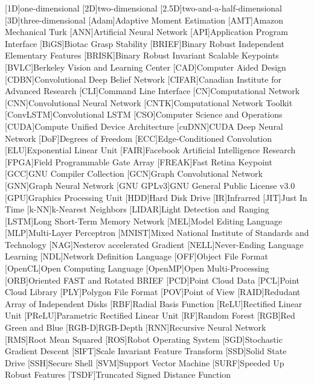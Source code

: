 \begin{acronym}
	[1D]{one-dimensional}
	[2D]{two-dimensional}
	[2.5D]{two-and-a-half-dimensional}
	[3D]{three-dimensional}
	[Adam]{Adaptive Moment Estimation}
	[AMT]{Amazon Mechanical Turk}
	[ANN]{Artificial Neural Network}
    [API]{Application Program Interface}
    [BiGS]{Biotac Grasp Stability}
	[BRIEF]{Binary Robust Independent Elementary Features}
	[BRISK]{Binary Robust Invariant Scalable Keypoints}
	[BVLC]{Berkeley Vision and Learning Center}
	[CAD]{Computer Aided Design}
	[CDBN]{Convolutional Deep Belief Network}
	[CIFAR]{Canadian Institute for Advanced Research}
	[CLI]{Command Line Interface}
	[CN]{Computational Network}
	[CNN]{Convolutional Neural Network}
    [CNTK]{Computational Network Toolkit}
    [ConvLSTM]{Convolutional LSTM}
	[CSO]{Computer Science and Operations}
	[CUDA]{Compute Unified Device Architecture}
    [cuDNN]{CUDA Deep Neural Network}
    [DoF]{Degrees of Freedom}
    [ECC]{Edge-Conditioned Convolution}
    [ELU]{Exponential Linear Unit}
	[FAIR]{Facebook Artificial Intelligence Research}
	[FPGA]{Field Programmable Gate Array}
	[FREAK]{Fast Retina Keypoint}
    [GCC]{GNU Compiler Collection}
    [GCN]{Graph Convolutional Network}
    [GNN]{Graph Neural Network}
	[GNU GPLv3]{GNU General Public License v3.0}
	[GPU]{Graphics Processing Unit}
	[HDD]{Hard Disk Drive}
	[IR]{Infrarred}
    [JIT]{Just In Time}
    [k-NN]{k-Nearest Neighbors}
    [LIDAR]{Light Detection and Ranging}
    [LSTM]{Long Short-Term Memory Network}
	[MEL]{Model Editing Language}
	[MLP]{Multi-Layer Perceptron}
	[MNIST]{Mixed National Institute of Standards and Technology}
    [NAG]{Nesterov accelerated Gradient}
    [NELL]{Never-Ending Language Learning}
	[NDL]{Network Definition Language}
	[OFF]{Object File Format}
	[OpenCL]{Open Computing Language}
	[OpenMP]{Open Multi-Processing}
	[ORB]{Oriented FAST and Rotated BRIEF}
	[PCD]{Point Cloud Data}
    [PCL]{Point Cloud Library}
    [PLY]{Polygon File Format}
	[POV]{Point of View}
	[RAID]{Redudant Array of Independent Disks}
	[RBF]{Radial Basis Function}
	[ReLU]{Rectified Linear Unit}
    [PReLU]{Parametric Rectified Linear Unit}
    [RF]{Random Forest}
	[RGB]{Red Green and Blue}
    [RGB-D]{RGB-Depth}
	[RNN]{Recursive Neural Network}
    [RMS]{Root Mean Squared}
    [ROS]{Robot Operating System}
	[SGD]{Stochastic Gradient Descent}
	[SIFT]{Scale Invariant Feature Transform}
	[SSD]{Solid State Drive}
	[SSH]{Secure Shell}
	[SVM]{Support Vector Machine}
	[SURF]{Speeded Up Robust Features}
	[TSDF]{Truncated Signed Distance Function}
\end{acronym}
